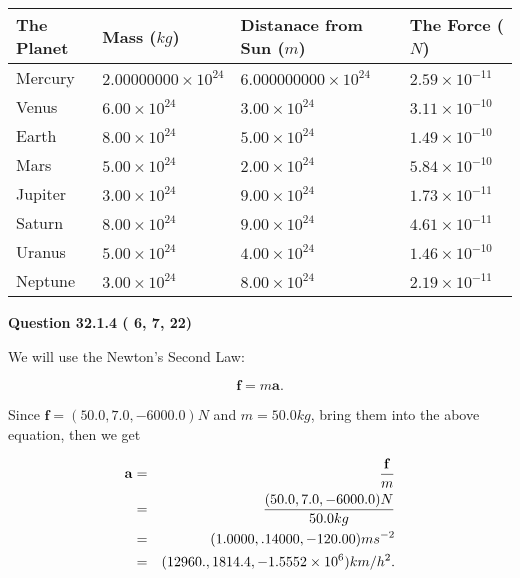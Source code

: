 \documentclass[12pt]{article}
\begin{document}
\vspace{0.2in}
 
 
\begin{tabular}{|l|l|l|l|}
\hline
The Planet & Mass ($kg$) & Distanace from Sun ($m$) & The Force ($N$)\\
\hline
Mercury  &
           $ %
2.00000000 \times 10^{24} $   &
             $ %
6.000000000 \times 10^{24} $    & $ %
2.59 \times 10^{-11} $
\\  \hline
Venus    &
           $  %
6.00 \times 10^{24}  $     &
             $ %
3.00 \times 10^{24} $    & $ %
3.11 \times 10^{-10} $
\\  \hline
Earth    &
           $  %
8.00 \times 10^{24}  $     &
             $ %
5.00 \times 10^{24} $    & $ %
1.49 \times 10^{-10} $
\\   \hline
Mars     &
           $  %
5.00 \times 10^{24} $     &
             $ %
2.00 \times 10^{24} $    & $ %
5.84 \times 10^{-10} $
\\   \hline
Jupiter  &
           $  %
3.00 \times 10^{24} $    &
             $ %
9.00 \times 10^{24} $    & $ %
1.73 \times 10^{-11} $
\\  \hline
Saturn   &
           $  %
8.00 \times 10^{24} $    &
             $ %
9.00 \times 10^{24}  $    & $ %
4.61 \times 10^{-11} $
\\  \hline
Uranus   &
           $  %
5.00 \times 10^{24} $    &
             $ %
4.00 \times 10^{24} $    & $ %
1.46 \times 10^{-10} $
\\  \hline
Neptune  &
           $  %
3.00 \times 10^{24} $    &
             $ %
8.00 \times 10^{24} $    & $ %
2.19 \times 10^{-11} $
\\  \hline
 
\end{tabular}
 
 
 
 
  
\vspace{0.2in}
  
{\textbf{\Large{Question
32.1.4 
 (          6,          7,         22)
}}}
  
  
 
 

We will use the Newton's Second Law:
 
\[
\mathbf{f}=m\mathbf{a}.
\]
 
Since $\mathbf{f}=( %
50.0,  %
7.0,  %
-6000.0 )N$
and $m= %
50.0 kg$, bring them into the above equation, then we get
 
\begin{eqnarray*}
\mathbf{a}&=&\frac{\mathbf{f}}m  \\
&=&\frac{(
50.0 ,
7.0 ,
-6000.0 )N
}{ %
50.0 kg}  \\
&=&(
1.0000 ,
.14000,
-120.00
)ms^{-2} \\
&=&(
12960. ,
1814.4 ,
-1.5552 \times 10^{6}
)km/h^2.
\end{eqnarray*}
 
\end{document}
